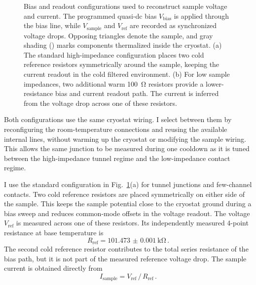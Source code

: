             \begin{figure}[t]
                \centering
                \hfill
                \caption{Bias and readout configurations used to reconstruct sample voltage and current. The programmed quasi-dc bias $V_\mathrm{bias}$ is applied through the bias line, while $V_\mathrm{sample}$ and $V_\mathrm{ref}$ are recorded as synchronized voltage drops. Opposing triangles denote the sample, and gray shading () marks components thermalized inside the cryostat. (a) The standard high-impedance configuration places two cold reference resistors symmetrically around the sample, keeping the current readout in the cold filtered environment. (b) For low sample impedances, two additional warm \qty{100}{\ohm} resistors provide a lower-resistance bias and current readout path. The current is inferred from the voltage drop across one of these resistors.}
                \label{fig:setup:measurement-schema}
            \end{figure}

            Both configurations use the same cryostat wiring. I select between them by reconfiguring the room-temperature connections and reusing the available internal lines, without warming up the cryostat or modifying the sample wiring. This allows the same junction to be measured during one cooldown as it is tuned between the high-impedance tunnel regime and the low-impedance contact regime.

            I use the standard configuration in Fig.~\ref{fig:setup:measurement-schema}(a) for tunnel junctions and few-channel contacts. Two cold reference resistors are placed symmetrically on either side of the sample. This keeps the sample potential close to the cryostat ground during a bias sweep and reduces common-mode offsets in the voltage readout. The voltage $V_\mathrm{ref}$ is measured across one of these resistors. Its independently measured 4-point resistance at base temperature is
            \begin{equation}
                R_\mathrm{ref} = \qty{101.473(1)}{\kilo\ohm}\,.
                \label{eq:setup:cold-reference-resistance}
            \end{equation}
            The second cold reference resistor contributes to the total series resistance of the bias path, but it is not part of the measured reference voltage drop. The sample current is obtained directly from
            \begin{equation}
                I_\mathrm{sample} = V_\mathrm{ref}\,/\,R_\mathrm{ref}\,.
                \label{eq:setup:sample-current}
            \end{equation}

